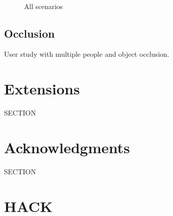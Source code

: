 \documentclass{sigchi}
\begin{document}
\begin{figure}
  \centering
  
  \caption{All scenarios}~\label{fig:scenarios}
\end{figure}

\subsection{Occlusion}

User study with multiple people and object occlusion.

\section{Extensions}

SECTION

\section{Acknowledgments}

SECTION



\section{HACK}



%
%
%
%
%
\balance{}



\end{document}
